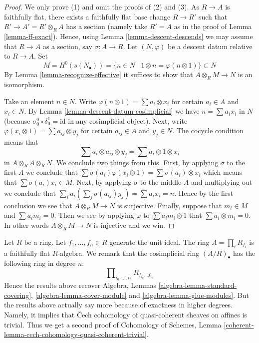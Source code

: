 \begin{proof}
We only prove (1) and omit the proofs of (2) and (3).
As $R \to A$ is faithfully flat, there exists a faithfully flat
base change $R \to R'$ such that $R' \to A' = R' \otimes_R A$ has
a section (namely take $R' = A$ as in the proof of
Lemma \ref{lemma-ff-exact}). Hence, using
Lemma \ref{lemma-descent-descends}
we may assume that $R \to A$ as a section, say $\sigma : A \to R$.
Let $(N, \varphi)$ be a descent datum relative to $R \to A$.
Set
$$
M = H^0(s(N_\bullet)) = \{n \in N \mid 1 \otimes n = \varphi(n \otimes 1)\}
\subset
N
$$
By Lemma \ref{lemma-recognize-effective} it suffices to show that
$A \otimes_R M \to N$ is an isomorphism.

\medskip\noindent
Take an element $n \in N$. Write
$\varphi(n \otimes 1) = \sum a_i \otimes x_i$ for certain
$a_i \in A$ and $x_i \in N$. By Lemma \ref{lemma-descent-datum-cosimplicial}
we have $n = \sum a_i x_i$ in $N$ (because
$\sigma^0_0 \circ \delta^1_0 = \text{id}$ in any cosimplicial object).
Next, write $\varphi(x_i \otimes 1) = \sum a_{ij} \otimes y_j$ for
certain $a_{ij} \in A$ and $y_j \in N$.
The cocycle condition means that
$$
\sum a_i \otimes a_{ij} \otimes y_j = \sum a_i \otimes 1 \otimes x_i
$$
in $A \otimes_R A \otimes_R N$. We conclude two things from this.
First, by applying $\sigma$ to the first $A$ we conclude that
$\sum \sigma(a_i) \varphi(x_i \otimes 1) = \sum \sigma(a_i) \otimes x_i$
which means that $\sum \sigma(a_i) x_i \in M$. Next, by applying
$\sigma$ to the middle $A$ and multiplying out we conclude that
$\sum_i a_i (\sum_j \sigma(a_{ij}) y_j) = \sum a_i x_i = n$. Hence
by the first conclusion we see that $A \otimes_R M \to N$ is
surjective. Finally, suppose that $m_i \in M$ and
$\sum a_i m_i = 0$. Then we see by applying $\varphi$ to
$\sum a_im_i \otimes 1$ that $\sum a_i \otimes m_i = 0$.
In other words $A \otimes_R M \to N$ is injective and we win.
\end{proof}

\begin{remark}
\label{remark-standard-covering}
Let $R$ be a ring. Let $f_1, \ldots, f_n\in R$ generate the
unit ideal. The ring $A = \prod_i R_{f_i}$ is a faithfully flat
$R$-algebra. We remark that the cosimplicial ring $(A/R)_\bullet$
has the following ring in degree $n$:
$$
\prod\nolimits_{i_0, \ldots, i_n} R_{f_{i_0}\ldots f_{i_n}}
$$
Hence the results above recover
Algebra, Lemmas \ref{algebra-lemma-standard-covering},
\ref{algebra-lemma-cover-module} and \ref{algebra-lemma-glue-modules}.
But the results above actually say more because of exactness
in higher degrees. Namely, it implies that {\v C}ech cohomology of
quasi-coherent sheaves on affines is trivial. Thus we get a second
proof of Cohomology of Schemes, Lemma
\ref{coherent-lemma-cech-cohomology-quasi-coherent-trivial}.
\end{remark}

